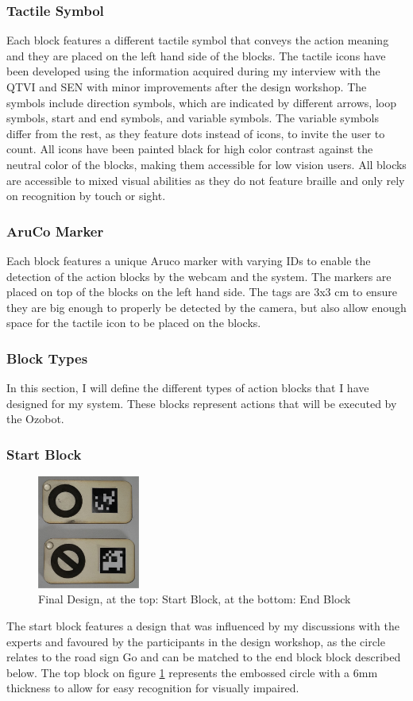 \documentclass[oneside,%
                    author={Malak Hajji},
                    degree={BSc},
                    title={Designing An Accessible Ozobot Programming Platform for Students},
                  subtitle={With Mixed Visual Abilities}]{dissertation}
\begin{document}
\subsubsection{Tactile Symbol}
Each block features a different tactile symbol that conveys the action meaning and they are placed on the left hand side of the blocks. The tactile icons have been developed using the information acquired during my interview with the QTVI and SEN with minor improvements after the design workshop. The symbols include direction symbols, which are indicated by different arrows, loop symbols, start and end symbols, and variable symbols. The variable symbols differ from the rest, as they feature dots instead of icons, to invite the user to count.  
All icons have been painted black for high color contrast against the neutral color of the blocks, making them accessible for low vision users.
All blocks are accessible to mixed visual abilities as they do not feature braille and only rely on recognition by touch or sight.

\subsubsection{AruCo Marker}
Each block features a unique Aruco marker with varying IDs to enable the detection of the action blocks by the webcam and the system. The markers are placed on top of the blocks on the left hand side. The tags are 3x3 cm to ensure they are big enough to properly be detected by the camera, but also allow enough space for the tactile icon to be placed on the blocks.
\subsubsection{Block Types}
In this section, I will define the different types of action blocks that I have designed for my system. These blocks represent actions that will be executed by the Ozobot.
\subsubsection{Start Block}
\FloatBarrier
\begin{figure}[h]
    \centering
    \includegraphics[width=0.3\textwidth]{thesis/startandend.eps}
    \caption{Final Design, at the top: Start Block, at the bottom: End Block}
    \label{fig-startandend}
\end{figure}
\FloatBarrier
The start block features a design that was influenced by my discussions with the experts and favoured by the participants in the design workshop, as the circle relates to the road sign Go and can be matched to the end block block described below. The top block on figure \ref{fig-startandend} represents the embossed circle with a 6mm thickness to allow for easy recognition for visually impaired. 
\end{document}
